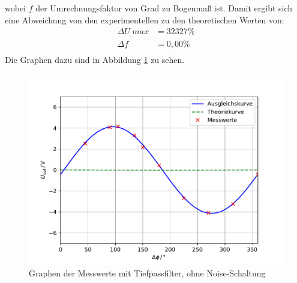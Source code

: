 wobei $f$ der Umrechnungsfaktor von Grad zu Bogenmaß ist.
Damit ergibt sich eine Abweichung von den experimentellen zu den theoretischen Werten von:
\begin{align*}
\Delta U_.{max} &= 32327\% \\
\Delta f		&= 0,00\% \\
\end{align*}
Die Graphen dazu sind in Abbildung \ref{fig:U2} zu sehen.
\begin{figure}
\centering
\includegraphics[scale=0.5]{content/images/plot.pdf}
\caption{Graphen der Messwerte mit Tiefpassfilter, ohne Noise-Schaltung}
\label{fig:U2}
\end{figure}
